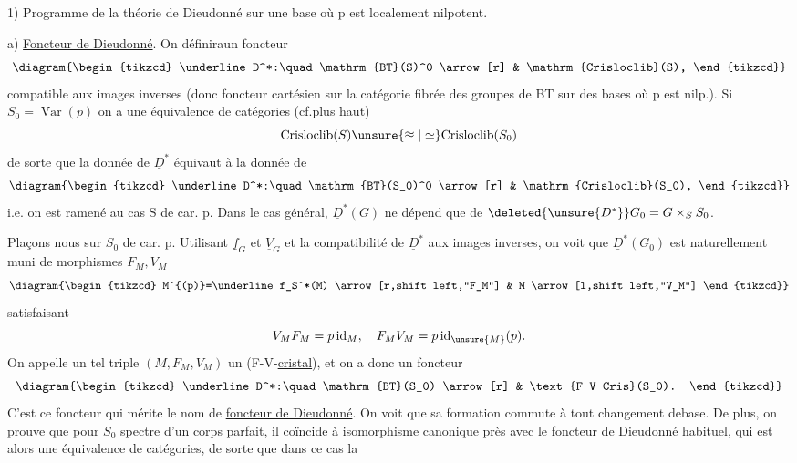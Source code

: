 1) Programme de la théorie de Dieudonné sur une base  où p est localement nilpotent.

 a) \uline{Foncteur de Dieudonné}. On  définiraun foncteur
\[
\diagram{\begin{tikzcd}
\underline D^*:\quad \mathrm{BT}(S)^0 \arrow[r] & \mathrm{Crisloclib}(S),
\end{tikzcd}}
\]
compatible aux images inverses (donc foncteur cartésien sur la catégorie fibrée des groupes de BT sur des bases où p est  nilp.). Si $S_0=\operatorname{Var}(p)$ on a une équivalence de catégories (cf.\qquad plus haut)
\[
\mathrm{Crisloclib}(S)\unsure{\approxeq|\simeq}\mathrm{Crisloclib}(S_0)
\]
de sorte que la donnée de $\underline D^*$ équivaut à la donnée de
\[
\diagram{\begin{tikzcd}
\underline D^*:\quad\mathrm{BT}(S_0)^0 \arrow[r] & \mathrm{Crisloclib}(S_0),
\end{tikzcd}}
\]
i.e. on est ramené  au cas S de car. p. 
Dans le cas général, $\underline D^*(G)$ ne dépend que de $\deleted{\unsure{D^*}}G_0=G\times_S S_0$.

 Plaçons nous sur $S_0$ de car. p. Utilisant $\underline f_G$ et $\underline V_G$ et la compatibilité de $\underline D^*$ aux images inverses, on voit que 
$\underline D^*(G_0)$  est naturellement muni de morphismes $F_M,V_M$ 
\[
\diagram{\begin{tikzcd}
M^{(p)}=\underline f_S^*(M) \arrow[r,shift left,"F_M"] & M \arrow[l,shift left,"V_M"]
\end{tikzcd}}
\]
satisfaisant
\[
V_MF_M=p\operatorname{id}_M,\quad F_MV_M=p\operatorname{id}_{\unsure{M}}(p).
\]
On appelle un tel triple $(M,F_M,V_M)$ un (F-V-\uline{cristal}), et on a donc un foncteur
\[
\diagram{\begin{tikzcd}
\underline D^*:\quad\mathrm{BT}(S_0) \arrow[r] & \text{F-V-Cris}(S_0).
\end{tikzcd}}
\]
C'est ce foncteur qui mérite le nom de \uline{foncteur de Dieudonné}. On   voit que sa formation commute à tout changement de\inserted{ }base. De plus, on prouve que pour $S_0$ spectre d'un corps parfait, il coïncide  à isomorphisme canonique près avec le foncteur de Dieudonné habituel, qui est alors une équivalence de catégories, de sorte que dans ce cas la
